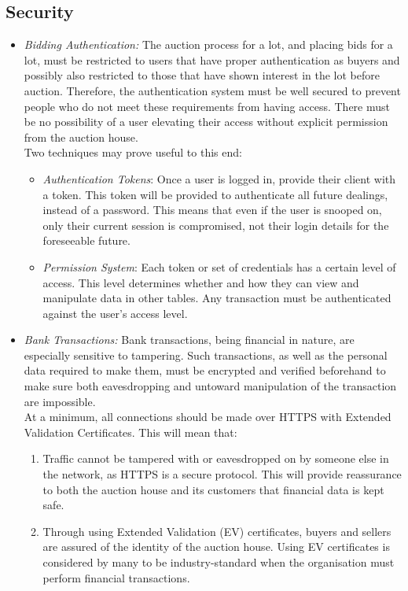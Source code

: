 \documentclass[titlepage, 12pt]{extarticle}
\begin{document}
\subsection{Security}
\begin{itemize}
\item {\it Bidding Authentication:} The auction process for a lot, and placing bids for a lot, must be restricted to users that have proper authentication as buyers and possibly also restricted to those that have shown interest in the lot before auction. Therefore, the authentication system must be well secured to prevent people who do not meet these requirements from having access. There must be no possibility of a user elevating their access without explicit permission from the auction house. 
\\Two techniques may prove useful to this end:
    \begin{itemize}
    \item {\it Authentication Tokens}: Once a user is logged in, provide their client with a token. This token will be provided to authenticate all future dealings, instead of a password. This means that even if the user is snooped on, only their current session is compromised, not their login details for the foreseeable future.
    \item {\it Permission System}: Each token or set of credentials has a certain level of access. This level determines whether and how they can view and manipulate data in other tables. Any transaction must be authenticated against the user's access level.
    \end{itemize}
\item {\it Bank Transactions:} Bank transactions, being financial in nature, are especially sensitive to tampering. Such transactions, as well as the personal data required to make them, must be encrypted and verified beforehand to make sure both eavesdropping and untoward manipulation of the transaction are impossible. 
  \\ At a minimum, all connections should be made over HTTPS with Extended Validation Certificates. This will mean that:
  \begin{enumerate}
  \item Traffic cannot be tampered with or eavesdropped on by someone else in the network, as HTTPS is a secure protocol. This will provide reassurance to both the auction house and its customers that financial data is kept safe.
  \item Through using Extended Validation (EV) certificates, buyers and sellers are assured of the identity of the auction house. Using EV certificates is considered by many to be industry-standard when the organisation must perform financial transactions.

\end{enumerate}
\end{itemize}
\end{document}
